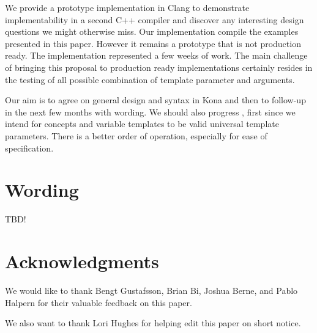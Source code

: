 \documentclass{wg21}
\begin{document}
We provide a prototype implementation in Clang to demonstrate implementability in a second C++ compiler and discover any interesting design questions we might otherwise
miss. Our implementation compile the examples presented in this paper. However it remains a prototype that is not production ready.
The implementation represented a few weeks of work. The main challenge of bringing this proposal to production ready implementations certainly resides in the
testing of all possible combination of template parameter and arguments.


Our aim is to agree on general design and syntax in Kona and then to follow-up in the next few months with wording.
We should also progress , first since we intend for concepts and variable templates to be valid universal template parameters.
There is a better order of operation, especially for ease of specification.

\section{Wording}

TBD!

\section{Acknowledgments}

We would like to thank Bengt Gustafsson, Brian Bi, Joshua Berne, and Pablo Halpern for their
valuable feedback on this paper.


We also want to thank Lori Hughes for helping edit this paper on short notice.





\renewcommand{\section}[2]{}%

\begin{thebibliography}{9}


\end{thebibliography}
\end{document}
